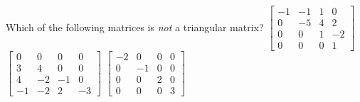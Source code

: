 \begin{activity}
Which of the following matrices is \emph{not} a triangular matrix?
{\(\begin{bmatrix} -1&-1&1&0
\\0&-5&4&2
\\0&0&1&-2
\\0&0&0&1 \end{bmatrix}\)}
{\(\begin{bmatrix} 0&0&0&0
\\3&4&0&0
\\4&-2&-1&0
\\-1&-2&2&-3 \end{bmatrix}\)}
{\(\begin{bmatrix} -2&0&0&0
\\0&-1&0&0
\\0&0&2&0
\\0&0&0&3 \end{bmatrix}\)}
\end{activity}





